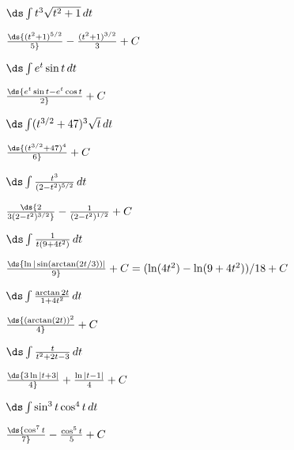 \begin{exercises}
\begin{exercise} $\ds\int t^3\sqrt{t^2+1}\,dt$
\begin{answer} $\ds{(t^2+1)^{5/2}\over 5}-{(t^2+1)^{3/2}\over 3}+C$
\end{answer}\end{exercise}

\begin{exercise} $\ds\int e^t\sin t\,dt$
\begin{answer} $\ds{e^t\sin t-e^t\cos t\over 2}+C$
\end{answer}\end{exercise}

\begin{exercise} $\ds\int (t^{3/2}+47)^3\sqrt{t}\,dt$
\begin{answer} $\ds{(t^{3/2}+47)^4\over6}+C$
\end{answer}\end{exercise}

\begin{exercise} $\ds\int {t^3\over (2-t^2)^{5/2}}\,dt$
\begin{answer} $\ds{2\over 3(2-t^2)^{3/2}}-{1\over(2-t^2)^{1/2}}+C$
\end{answer}\end{exercise}

\begin{exercise} $\ds\int {1\over t(9+4t^2)}\,dt$
\begin{answer} $\ds{\ln|\sin(\arctan(2t/3))|\over9}+C = 
(\ln(4t^2)-\ln(9+4t^2))/18 + C$
\end{answer}\end{exercise}

\begin{exercise} $\ds\int {\arctan 2t\over 1+4t^2}\,dt$
\begin{answer} $\ds{(\arctan(2t))^2\over4}+C$
\end{answer}\end{exercise}

\begin{exercise} $\ds\int {t\over t^2+2t-3}\,dt$
\begin{answer} $\ds{3\ln|t+3|\over 4}+{\ln|t-1|\over4}+C$
\end{answer}\end{exercise}

\begin{exercise} $\ds\int \sin^3 t\cos^4 t\,dt$
\begin{answer} $\ds{\cos^7 t\over 7}-{\cos^5 t\over 5}+C$
\end{answer}\end{exercise}


\end{exercises}
